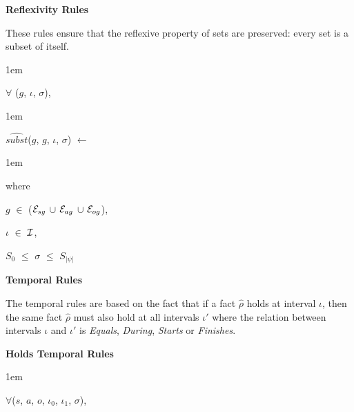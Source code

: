 \documentclass[11pt]{report}
\newenvironment{vquote}
{
  \begin{list}{}{\leftmargin 1em}\item[]
}
{
  \end{list}
}
\begin{document}
\begin{itemize}
            \item
              {\bf Reflexivity Rules}

              These rules ensure that the reflexive property of sets are
              preserved: every set is a subset of itself.

              \begin{vquote}
                $\forall$ ($g$, $\iota$, $\sigma$),
              \end{vquote}

              \begin{vquote}
                $\hat{subst}$($g$, $g$, $\iota$, $\sigma$) $\leftarrow$
              \end{vquote}

              \begin{vquote}
                where

                \hspace{1em}
                $g$ $\in$ (${\cal E}_{sg}$ $\cup$ ${\cal E}_{ag}$ $\cup$ ${\cal E}_{og}$),

                \hspace{1em}
                $\iota$ $\in$ ${\cal I}$,

                \hspace{1em}
                $S_{0}$ $\leq$ $\sigma$ $\leq$ $S_{|\psi|}$
              \end{vquote}
            
            \item
              {\bf Temporal Rules}

              The temporal rules are based on the fact that if a fact
              $\hat{\rho}$ holds at interval $\iota$, then the same fact
              $\hat{\rho}$ must also hold at all intervals $\iota'$ where
              the relation between intervals $\iota$ and $\iota'$ is
              {\em Equals}, {\em During}, {\em Starts} or {\em Finishes}.

              \begin{itemize}
              
                \item
                  {\bf Holds Temporal Rules}

                  \begin{vquote}
                    $\forall$($s$, $a$, $o$, $\iota_0$, $\iota_1$, $\sigma$),
                  \end{vquote}
                  

\end{itemize}
\end{itemize}
\end{document}
